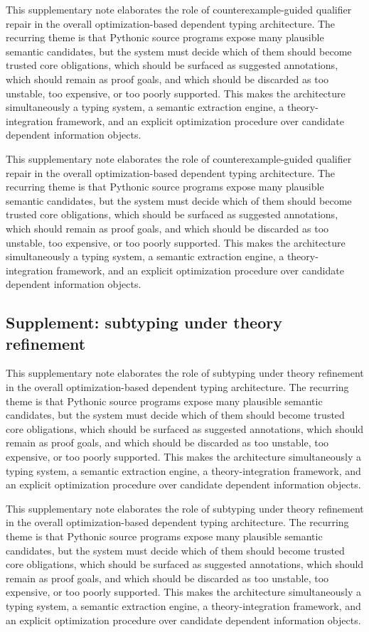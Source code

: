 \documentclass[11pt]{article}
\theoremstyle{definition}
\theoremstyle{plain}
\begin{document}
This supplementary note elaborates the role of counterexample-guided qualifier repair in the overall
optimization-based dependent typing architecture. The recurring theme is that
Pythonic source programs expose many plausible semantic candidates, but the
system must decide which of them should become trusted core obligations, which
should be surfaced as suggested annotations, which should remain as proof
goals, and which should be discarded as too unstable, too expensive, or too
poorly supported. This makes the architecture simultaneously a typing system,
a semantic extraction engine, a theory-integration framework, and an explicit
optimization procedure over candidate dependent information objects.

This supplementary note elaborates the role of counterexample-guided qualifier repair in the overall
optimization-based dependent typing architecture. The recurring theme is that
Pythonic source programs expose many plausible semantic candidates, but the
system must decide which of them should become trusted core obligations, which
should be surfaced as suggested annotations, which should remain as proof
goals, and which should be discarded as too unstable, too expensive, or too
poorly supported. This makes the architecture simultaneously a typing system,
a semantic extraction engine, a theory-integration framework, and an explicit
optimization procedure over candidate dependent information objects.

\subsection{Supplement: subtyping under theory refinement}
This supplementary note elaborates the role of subtyping under theory refinement in the overall
optimization-based dependent typing architecture. The recurring theme is that
Pythonic source programs expose many plausible semantic candidates, but the
system must decide which of them should become trusted core obligations, which
should be surfaced as suggested annotations, which should remain as proof
goals, and which should be discarded as too unstable, too expensive, or too
poorly supported. This makes the architecture simultaneously a typing system,
a semantic extraction engine, a theory-integration framework, and an explicit
optimization procedure over candidate dependent information objects.

This supplementary note elaborates the role of subtyping under theory refinement in the overall
optimization-based dependent typing architecture. The recurring theme is that
Pythonic source programs expose many plausible semantic candidates, but the
system must decide which of them should become trusted core obligations, which
should be surfaced as suggested annotations, which should remain as proof
goals, and which should be discarded as too unstable, too expensive, or too
poorly supported. This makes the architecture simultaneously a typing system,
a semantic extraction engine, a theory-integration framework, and an explicit
optimization procedure over candidate dependent information objects.
\end{document}
